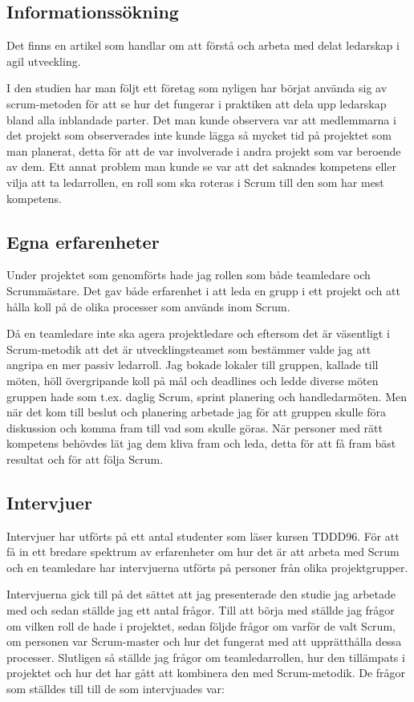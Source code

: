 \subsection{Informationssökning}
Det finns en artikel som handlar om att förstå och arbeta med delat ledarskap i agil utveckling.

I den studien har man följt ett företag som nyligen har börjat använda sig av scrum-metoden för att se hur det fungerar i praktiken att dela upp ledarskap bland alla inblandade parter. Det man kunde observera var att medlemmarna i det projekt som observerades inte kunde lägga så mycket tid på projektet som man planerat, detta för att de var involverade i andra projekt som var beroende av dem. Ett annat problem man kunde se var att det saknades kompetens eller vilja att ta ledarrollen, en roll som ska roteras i Scrum till den som har mest kompetens. \cite{sharedleader}

\subsection{Egna erfarenheter}
Under projektet som genomförts hade jag rollen som både teamledare och Scrummästare. Det gav både erfarenhet i att leda en grupp i ett projekt och att hålla koll på de olika processer som används inom Scrum.

Då en teamledare inte ska agera projektledare och eftersom det är väsentligt i Scrum-metodik att det är utvecklingsteamet som bestämmer valde jag att angripa en mer passiv ledarroll. Jag bokade lokaler till gruppen, kallade till möten, höll övergripande koll på mål och deadlines och ledde diverse möten gruppen hade som t.ex. daglig Scrum, sprint planering och handledarmöten. Men när det kom till beslut och planering arbetade jag för att gruppen skulle föra diskussion och komma fram till vad som skulle göras. När personer med rätt kompetens behövdes lät jag dem kliva fram och leda, detta för att få fram bäst resultat och för att följa Scrum.

\subsection{Intervjuer}
Intervjuer har utförts på ett antal studenter som läser kursen TDDD96. För att få in ett bredare spektrum av erfarenheter om hur det är att arbeta med Scrum och en teamledare har intervjuerna utförts på personer från olika projektgrupper.

Intervjuerna gick till på det sättet att jag presenterade den studie jag arbetade med och sedan ställde jag ett antal frågor. Till att börja med ställde jag frågor om vilken roll de hade i projektet, sedan följde frågor om varför de valt Scrum, om personen var Scrum-master och hur det fungerat med att upprätthålla dessa processer. Slutligen så ställde jag frågor om teamledarrollen, hur den tillämpats i projektet och hur det har gått att kombinera den med Scrum-metodik. De frågor som ställdes till till de som intervjuades var:

